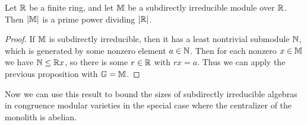 \documentclass[letterpaper,11pt]{article}
\begin{document}
\begin{cor} Let $\mathbb{R}$ be a finite ring, and let $\mathbb{M}$ be a subdirectly irreducible module over $\mathbb{R}$. Then $|\mathbb{M}|$ is a prime power dividing $|\mathbb{R}|$.
\end{cor}
\begin{proof} If $\mathbb{M}$ is subdirectly irreducible, then it has a least nontrivial submodule $\mathbb{N}$, which is generated by some nonzero element $a \in \mathbb{N}$. Then for each nonzero $x \in \mathbb{M}$ we have $\mathbb{N} \le \mathbb{R} x$, so there is some $r \in \mathbb{R}$ with $rx = a$. Thus we can apply the previous proposition with $\mathbb{G} = \mathbb{M}$.
\end{proof}

Now we can use this result to bound the sizes of subdirectly irreducible algebras in congruence modular varieties in the special case where the centralizer of the monolith is abelian.
\end{document}
